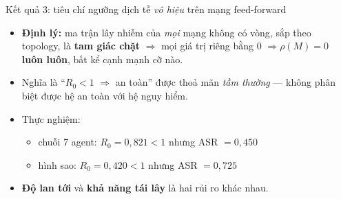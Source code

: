 \documentclass[aspectratio=169,11pt]{beamer}
\begin{document}
\begin{frame}{Kết quả 3: tiêu chí ngưỡng dịch tễ \emph{vô hiệu} trên mạng feed-forward}
  \begin{itemize}
    \item \textbf{Định lý:} ma trận lây nhiễm của \emph{mọi} mạng không có vòng, sắp theo
          topology, là \textbf{tam giác chặt} $\Rightarrow$ mọi giá trị riêng bằng $0$
          $\Rightarrow \rho(M)=0$ \textbf{luôn luôn}, bất kể cạnh mạnh cỡ nào.
    \item Nghĩa là ``$R_0<1$ $\Rightarrow$ an toàn'' được thoả mãn \emph{tầm thường} ---
          không phân biệt được hệ an toàn với hệ nguy hiểm.
    \item Thực nghiệm:
      \begin{itemize}
        \item chuỗi 7 agent: $R_0=0{,}821<1$ nhưng ASR $=0{,}450$
        \item hình sao: $R_0=0{,}420<1$ nhưng ASR $=0{,}725$
      \end{itemize}
    \item \textbf{Độ lan tới} và \textbf{khả năng tái lây} là hai rủi ro khác nhau.
  \end{itemize}
\end{frame}
\end{document}
